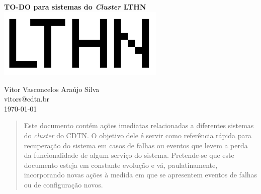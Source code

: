 \documentclass[11pt,a4]{report} %
\begin{document}
\begin{titlepage}
    \centering
    \vfill
    {\bfseries\Large
		TO-DO para sistemas do \textit{Cluster} LTHN\\
		\vskip2cm
	    \includegraphics[width=8cm]{lthn.png} %

        \vskip2cm
		Vitor Vasconcelos Araújo Silva\\ 
		vitors@cdtn.br\\
		\vskip3cm
		\today\\

    }    
    \vfill
\end{titlepage}




\tableofcontents %

\begin{abstract}
  Este documento contém ações imediatas relacionadas a diferentes sistemas do \textit{cluster} do CDTN.
  O objetivo dele é servir como referência rápida para recuperação do sistema em casos de falhas ou
  eventos que levem a perda da funcionalidade de algum serviço do sistema. Pretende-se que este documento
  esteja em constante evolução e vá, paulatinamente, incorporando novas ações à medida em que se apresentem
  eventos de falhas ou de configuração novos. 
\end{abstract}

\end{document}
